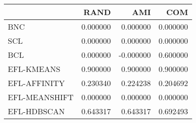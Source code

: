 \begin{tabular}{lrrr}
\toprule
 & RAND & AMI & COM \\
\midrule
BNC & 0.000000 & 0.000000 & 0.000000 \\
SCL & 0.000000 & 0.000000 & 0.000000 \\
BCL & 0.000000 & -0.000000 & 0.600000 \\
EFL-KMEANS & 0.900000 & 0.900000 & 0.900000 \\
EFL-AFFINITY & 0.230340 & 0.224238 & 0.204692 \\
EFL-MEANSHIFT & 0.000000 & 0.000000 & 0.000000 \\
EFL-HDBSCAN & 0.643317 & 0.643317 & 0.692493 \\
\bottomrule
\end{tabular}
